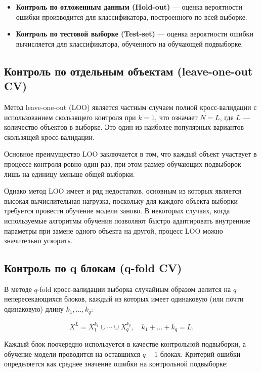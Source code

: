 \begin{itemize}
    \item \textbf{Контроль по отложенным данным (Hold-out)} — оценка вероятности ошибки производится для классификатора, построенного по всей выборке.
    \item \textbf{Контроль по тестовой выборке (Test-set)} — оценка вероятности ошибки вычисляется для классификатора, обученного на обучающей подвыборке.
\end{itemize}

\subsection{Контроль по отдельным объектам (leave-one-out CV)}

Метод leave-one-out (LOO) является частным случаем полной кросс-валидации с использованием скользящего контроля при \( k = 1 \), что означает \( N = L \), где \( L \) — количество объектов в выборке. Это один из наиболее популярных вариантов скользящей кросс-валидации.

Основное преимущество LOO заключается в том, что каждый объект участвует в процессе контроля ровно один раз, при этом размер обучающих подвыборок лишь на единицу меньше общей выборки.

Однако метод LOO имеет и ряд недостатков, основным из которых является высокая вычислительная нагрузка, поскольку для каждого объекта выборки требуется провести обучение модели заново. В некоторых случаях, когда используемые алгоритмы обучения позволяют быстро адаптировать внутренние параметры при замене одного объекта на другой, процесс LOO можно значительно ускорить.

\subsection{Контроль по q блокам (q-fold CV)}

В методе \( q \)-fold кросс-валидации выборка случайным образом делится на \( q \) непересекающихся блоков, каждый из которых имеет одинаковую (или почти одинаковую) длину \( k_1, \ldots, k_q \):

\[
X^L = X^{k_1}_1 \cup \cdots \cup X^{k_q}_q, \quad k_1 + \dots + k_q = L.
\]

Каждый блок поочередно используется в качестве контрольной подвыборки, а обучение модели проводится на оставшихся \( q-1 \) блоках. Критерий ошибки определяется как среднее значение ошибки на контрольной подвыборке:

